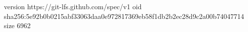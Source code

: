 version https://git-lfs.github.com/spec/v1
oid sha256:5e92b0b0215abf33063daa0e972817369eb58f1db2b2ec28d9c2a00b74047714
size 6962
